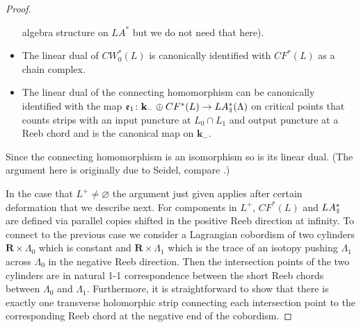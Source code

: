 \documentclass{gtpart}
\renewcommand{\k}{\mathbf{k}}
\newcommand{\e}{\mathfrak{e}}
\renewcommand{\R}{\mathbf{R}}
\renewcommand{\parallel}{{\mkern3mu\vphantom{\perp}\vrule depth 0pt\mkern2mu\vrule depth
0pt\mkern3mu}}
\begin{document}
\begin{proof}
\begin{itemize}
        algebra structure on $LA^{\ast}$ but we do not need that here).
\item The linear dual of $CW^{\ast}_{0}(L)$ is canonically identified with $CF^{\ast}(L)$
    as a chain complex. 
\item The linear dual of the connecting homomorphism can be canonically identified with the map
    $\e_{1}\colon \k_{-} \oplus CF^{\ast}(L)\to LA^{\ast}_{\parallel}(\Lambda)$ on critical points that counts
        strips with an input puncture at $L_0 \cap L_1$ and output puncture at a Reeb chord and is the
        canonical map on $\k_{-}$.
\end{itemize}
Since the connecting homomorphism is an isomorphism so is its linear dual. (The argument here is originally due to Seidel, compare \cite[Theorem 7.2]{EKH}.) 

In the case that $L^{+}\ne \varnothing$ the argument just given applies after certain deformation that we describe next. For components in $L^{+}$, $CF^{\ast}(L)$ and $LA^{\ast}_{\parallel}$ are defined via parallel copies shifted in the positive Reeb direction at infinity. To connect to the previous case we consider a Lagrangian cobordism of two cylinders $\R\times\Lambda_{0}$ which is constant and $\R\times \Lambda_{1}$ which is the trace of an isotopy pushing $\Lambda_{1}$ across $\Lambda_{0}$ in the negative Reeb direction. Then the intersection points of the two cylinders are in natural 1-1 correspondence between the short Reeb chords between $\Lambda_{0}$ and $\Lambda_{1}$. Furthermore, it is straightforward to show that there is exactly one transverse holomorphic strip connecting each intersection point to the corresponding Reeb chord at the negative end of the cobordism. 


\end{proof}
\end{document}
